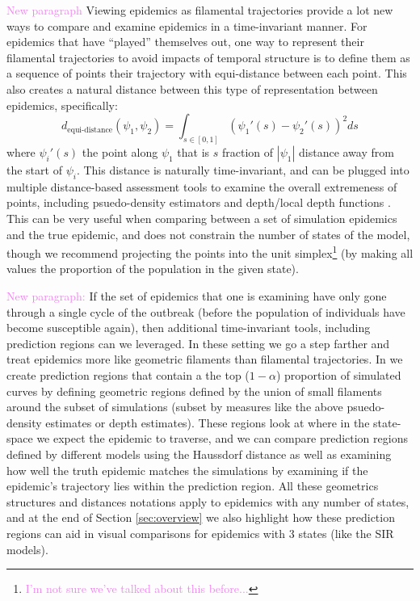 \documentclass[
  shortnames]{jss}
\begin{document}
\textcolor{violet}{New paragraph} Viewing epidemics as filamental
trajectories provide a lot new ways to compare and examine epidemics in
a time-invariant manner. For epidemics that have ``played'' themselves
out, one way to represent their filamental trajectories to avoid impacts
of temporal structure is to define them as a sequence of points their
trajectory with equi-distance between each point. This also creates a
natural distance between this type of representation between epidemics,
specifically: \[
d_\text{equi-distance}(\psi_1, \psi_2)  = \int_{s \in [0,1]} (\psi_1'(s) - \psi_2'(s))^2 ds
\] where \(\psi_i'(s)\) the point along \(\psi_1\) that is \(s\)
fraction of \(|\psi_1|\) distance away from the start of \(\psi_i\).
This distance is naturally time-invariant, and can be plugged into
multiple distance-based assessment tools to examine the overall
extremeness of points, including psuedo-density estimators and
depth/local depth functions
\citep[for examples see][]{Ciollaro2016, Geenens2017}. This can be very
useful when comparing between a set of simulation epidemics and the true
epidemic, and does not constrain the number of states of the model,
though we recommend projecting the points into the unit
simplex\footnote{\textcolor{violet}{I'm not sure we've talked about this before...}}
(by making all values the proportion of the population in the given
state).

\textcolor{violet}{New paragraph:} If the set of epidemics that one is
examining have only gone through a single cycle of the outbreak (before
the population of individuals have become susceptible again), then
additional time-invariant tools, including prediction regions can we
leveraged. In these setting we go a step farther and treat epidemics
more like geometric filaments than filamental trajectories. In
 we create prediction regions that contain a the top
(\(1-\alpha\)) proportion of simulated curves by defining geometric
regions defined by the union of small filaments around the subset of
simulations (subset by measures like the above psuedo-density estimates
or depth estimates). These regions look at where in the state-space we
expect the epidemic to traverse, and we can compare prediction regions
defined by different models using the Haussdorf distance as well as
examining how well the truth epidemic matches the simulations by
examining if the epidemic's trajectory lies within the prediction
region. All these geometrics structures and distances notations apply to
epidemics with any number of states, and at the end of Section
\ref{sec:overview} we also highlight how these prediction regions can
aid in visual comparisons for epidemics with 3 states (like the SIR
models).
\end{document}
